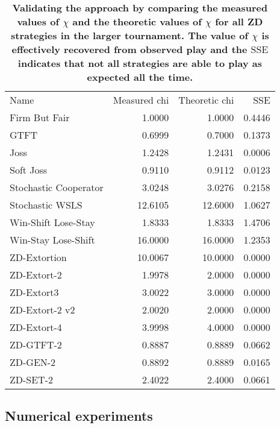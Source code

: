 \documentclass[10pt,letterpaper]{article}
\newlength\savedwidth
\newcommand\thickhline{\noalign{\global\savedwidth\arrayrulewidth\global\arrayrulewidth 2pt}%
\hline
\noalign{\global\arrayrulewidth\savedwidth}}
\newcommand{\SSe}{\text{SSE}}
\begin{document}
\begin{table}[!ht]
    \centering
    \caption{
        {\bf Validating the approach by comparing the measured values of
    \(\chi\) and the theoretic values of
    \(\chi\) for all ZD strategies in the larger tournament. The value of
    \(\chi\) is effectively recovered from observed play and the \(\SSe\)
    indicates that not all strategies are able to play as expected all the
time.}}
    \label{tbl:chi_versus_observed_chi_for_zd}

\begin{tabular}{lrrr}
\hline
                  Name &  Measured chi &  Theoretic chi &     SSE \\
\thickhline
         Firm But Fair &        1.0000 &     1.0000 &  0.4446 \\
                  GTFT &        0.6999 &     0.7000 &  0.1373 \\
                  Joss &        1.2428 &     1.2431 &  0.0006 \\
             Soft Joss &        0.9110 &     0.9112 &  0.0123 \\
 Stochastic Cooperator &        3.0248 &     3.0276 &  0.2158 \\
       Stochastic WSLS &       12.6105 &    12.6000 &  1.0627 \\
   Win-Shift Lose-Stay &        1.8333 &     1.8333 &  1.4706 \\
   Win-Stay Lose-Shift &       16.0000 &    16.0000 &  1.2353 \\
          ZD-Extortion &       10.0067 &    10.0000 &  0.0000 \\
           ZD-Extort-2 &        1.9978 &     2.0000 &  0.0000 \\
            ZD-Extort3 &        3.0022 &     3.0000 &  0.0000 \\
        ZD-Extort-2 v2 &        2.0020 &     2.0000 &  0.0000 \\
           ZD-Extort-4 &        3.9998 &     4.0000 &  0.0000 \\
             ZD-GTFT-2 &        0.8887 &     0.8889 &  0.0662 \\
              ZD-GEN-2 &        0.8892 &     0.8889 &  0.0165 \\
              ZD-SET-2 &        2.4022 &     2.4000 &  0.0661 \\
\hline
        \end{tabular}
\end{table}


\subsection*{Numerical experiments}
\end{document}
